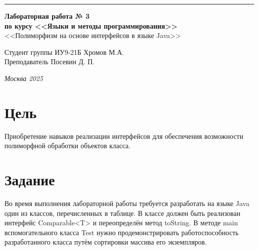 \documentclass[a4paper, 14pt]{extarticle}
\begin{document}
\begin{titlepage}
\vspace*{-16pt}
\hspace{30pt}\rule{0.866\textwidth}{0.4pt}
  
\vspace{11em}

\begin{center}
\Large {\bf Лабораторная работа № 3} \\ 
\large {\bf по курсу <<Языки и методы программирования>>} \\ 
\large <<Полиморфизм на основе интерфейсов в языке Java>>
\end{center}\normalsize

\vspace{8em}


\begin{flushright}
  {Студент группы ИУ9-21Б Хромов М.А.\hspace*{15pt} \\
  \vspace{2ex}
  Преподаватель Посевин Д. П.\hspace*{15pt}}
\end{flushright}

\bigskip

\vfill
 

\begin{center}
\textsl{Москва 2025}
\end{center}
\end{titlepage}

\renewcommand{\ttdefault}{pcr}

\setlength{\tabcolsep}{3pt}
\newpage
\section{Цель}\label{Sect::task}
\par
Приобретение навыков реализации интерфейсов для обеспечения возможности
полиморфной обработки объектов класса.  

\section{Задание}\label{Sect::task}
\par
Во время выполнения лабораторной работы требуется разработать на языке Java один из
классов, перечисленных в таблице. В классе должен быть реализован интерфейс Comparable<T>
и переопределён метод toString. В методе main вспомогательного класса Test нужно
продемонстрировать работоспособность разработанного класса путём сортировки массива его
экземпляров.
\par
\end{document}

